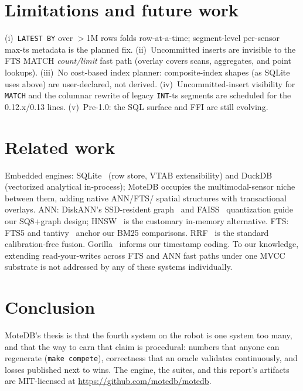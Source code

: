 \documentclass[10pt]{article}
\begin{document}
\section{Limitations and future work}
\label{sec:limits}
(i)~\texttt{LATEST BY} over $>$1M rows folds row-at-a-time; segment-level
per-sensor max-ts metadata is the planned fix. (ii)~Uncommitted inserts are
invisible to the FTS MATCH \emph{count/limit} fast path (overlay covers
scans, aggregates, and point lookups). (iii)~No cost-based index planner:
composite-index shapes (as SQLite uses above) are user-declared, not
derived. (iv)~Uncommitted-insert visibility for \texttt{MATCH} and the
columnar rewrite of legacy \texttt{INT}-ts segments are scheduled for the
0.12.x/0.13 lines. (v)~Pre-1.0: the SQL surface and FFI are still evolving.

\section{Related work}
Embedded engines: SQLite~\cite{sqlite2022} (row store, VTAB extensibility)
and DuckDB~\cite{duckdb2019} (vectorized analytical in-process); MoteDB
occupies the multimodal-sensor niche between them, adding native ANN/FTS/
spatial structures with transactional overlays. ANN: DiskANN's
SSD-resident graph~\cite{diskann2019} and FAISS~\cite{faiss} quantization
guide our SQ8+graph design; HNSW~\cite{hnsw} is the customary
in-memory alternative. FTS: FTS5 and tantivy~\cite{tantivy} anchor our BM25
comparisons. RRF~\cite{cormack2009} is the standard calibration-free
fusion. Gorilla~\cite{gorilla} informs our timestamp coding. To our
knowledge, extending read-your-writes across FTS and ANN fast paths under
one MVCC substrate is not addressed by any of these systems individually.

\section{Conclusion}
MoteDB's thesis is that the fourth system on the robot is one system too
many, and that the way to earn that claim is procedural: numbers that
anyone can regenerate (\texttt{make compete}), correctness that an oracle
validates continuously, and losses published next to wins. The engine, the
suites, and this report's artifacts are MIT-licensed at
\url{https://github.com/motedb/motedb}.
\end{document}
